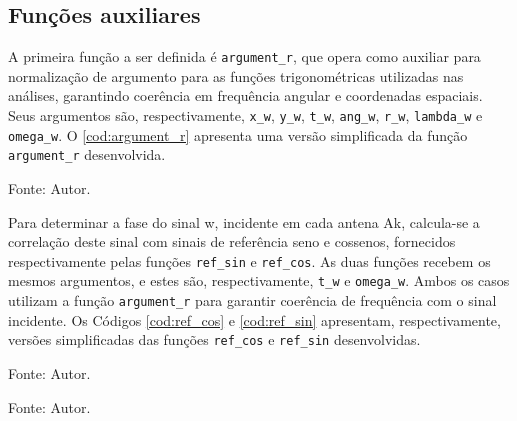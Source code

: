 \subsection{Funções auxiliares}

A primeira função a ser definida é \lstinline|argument_r|, que opera como auxiliar para normalização de argumento para as funções trigonométricas utilizadas nas análises, garantindo coerência em frequência angular e coordenadas espaciais.
Seus argumentos são, respectivamente, \lstinline|x_w|, \lstinline|y_w|, \lstinline|t_w|, \lstinline|ang_w|, \lstinline|r_w|, \lstinline|lambda_w| e \lstinline|omega_w|.
O \autoref{cod:argument_r} apresenta uma versão simplificada da função \lstinline|argument_r| desenvolvida.

\begin{lstfloat}[htbp]
	\centering
	
	\caption*{Fonte: Autor.}
\end{lstfloat}


Para determinar a fase do sinal \ac{w}, incidente em cada antena \ac{Ak}, calcula-se a correlação deste sinal com sinais de referência seno e cossenos, fornecidos respectivamente pelas funções \lstinline|ref_sin| e \lstinline|ref_cos|.
As duas funções recebem os mesmos argumentos, e estes são, respectivamente, \lstinline|t_w| e \lstinline|omega_w|.
Ambos os casos utilizam a função \lstinline|argument_r| para garantir coerência de frequência com o sinal incidente.
Os Códigos \ref{cod:ref_cos} e \ref{cod:ref_sin} apresentam, respectivamente, versões simplificadas das funções \lstinline|ref_cos| e \lstinline|ref_sin| desenvolvidas.


\begin{lstfloat}[htbp]
	\centering
	
	\caption*{Fonte: Autor.}
\end{lstfloat}

\begin{lstfloat}[htbp]
	\centering
	
	\caption*{Fonte: Autor.}
\end{lstfloat}


